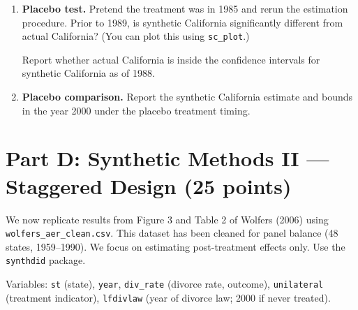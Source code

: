 \documentclass[11pt]{article}
\begin{document}
\begin{enumerate}[resume]
    \item \textbf{Placebo test.} Pretend the treatment was in 1985 and rerun the estimation procedure. Prior to 1989, is synthetic California significantly different from actual California? (You can plot this using \texttt{sc\_plot}.)

    Report whether actual California is inside the confidence intervals for synthetic California as of 1988.


    \item \textbf{Placebo comparison.} Report the synthetic California estimate and bounds in the year 2000 under the placebo treatment timing.


\end{enumerate}

\section*{Part D: Synthetic Methods II --- Staggered Design (25 points)}

We now replicate results from Figure 3 and Table 2 of Wolfers (2006) using \texttt{wolfers\_aer\_clean.csv}. This dataset has been cleaned for panel balance (48 states, 1959--1990). We focus on estimating post-treatment effects only. Use the \texttt{synthdid} package.

Variables: \texttt{st} (state), \texttt{year}, \texttt{div\_rate} (divorce rate, outcome), \texttt{unilateral} (treatment indicator), \texttt{lfdivlaw} (year of divorce law; 2000 if never treated).
\end{document}
